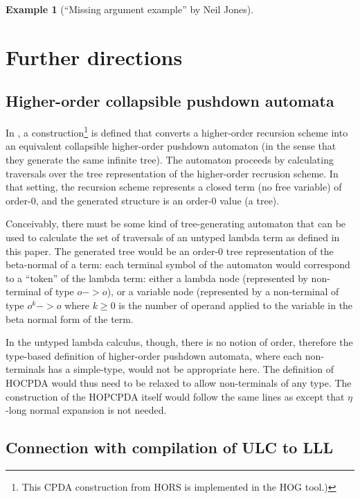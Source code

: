 \documentclass{article}
\theoremstyle{definition}
\newtheorem{example}{Example}[section]
\begin{document}
\begin{example}[``Missing argument example'' by Neil Jones]

\end{example}

\section{Further directions}

\subsection{Higher-order collapsible pushdown automata}

In \cite{Ong2006}, a construction\footnote{This CPDA construction from HORS is implemented in the HOG tool.)}
 is defined that converts a higher-order recursion scheme into an equivalent collapsible higher-order pushdown automaton (in the sense that they generate the same infinite tree). The automaton proceeds by calculating traversals over the tree representation of the higher-order recrusion scheme. In that setting, the recursion scheme represents a closed term (no free variable) of order-$0$, and the generated structure is an order-$0$ value (a tree).

Conceivably, there must be some kind of tree-generating automaton that can be used to calculate the set of traversals of an untyped lambda term as defined in this paper. The generated tree would be an order-$0$ tree representation of the beta-normal of a term: each terminal symbol of the automaton would correspond to a ``token'' of the lambda term: either a lambda node (represented by non-terminal of type $o->o$), or a variable node (represented by a non-terminal of type $o^k->o$ where $k\geq0$ is the number of operand applied to the variable in the beta normal form of the term.

In the untyped lambda calculus, though, there is no notion of order, therefore the type-based definition of higher-order pushdown automata, where each non-terminals has a simple-type, would not be appropriate here. The definition of HOCPDA would thus need to be relaxed to allow non-terminals of any type. The construction of the HOPCPDA itself would follow the same lines as \cite{Ong2006} except that $\eta$-long normal expansion is not needed.

\subsection{Connection with compilation of ULC to LLL}
\end{document}
